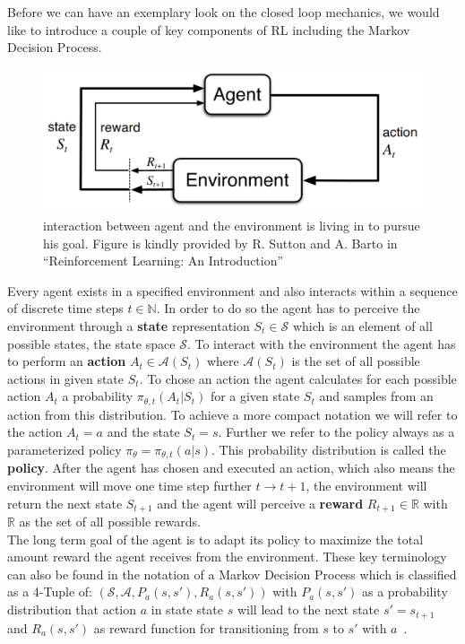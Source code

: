 Before we can have an exemplary look on the closed loop mechanics, we would like to introduce a couple of key components of RL including the Markov Decision Process.

% 
\begin{figure}
	\centering
    \includegraphics[width=\linewidth,]{figures/background/agent-environment-interaction.png}
	\caption[Interaction between agent and environment]{interaction between agent and the environment is living in to pursue his goal. Figure is kindly provided by R. Sutton and A. Barto in ``Reinforcement Learning: An Introduction''~\cite{SuttonBartoRLBook}}
	\label{fig:agent-environment_interaction}
	\endminipage
\end{figure}

Every agent exists in a specified environment and also interacts within a sequence of discrete time steps $t \in \mathbb{N}$. In order to do so the agent has to perceive the environment through a \textbf{state} representation $S_t \in \mathcal{S}$ which is an element of all possible states, the state space $\mathcal{S}$. To interact with the environment the agent has to perform an \textbf{action} $A_t \in \mathcal{A}(S_t)$ where $\mathcal{A}(S_t)$ is the set of all possible actions in given state $S_t$. To chose an action the agent calculates for each possible action $A_t$ a probability $\pi_{\theta, t}(A_t|S_t)$ for a given state $S_t$ and samples from an action from this distribution. To achieve a more compact notation we will refer to the action $A_t = a$ and the state $S_t = s$. Further we refer to the policy always as a parameterized policy $\pi_\theta = \pi_{\theta, t}(a|s)$.  
This probability distribution is called the \textbf{policy}. 
After the agent has chosen and executed an action, which also means the environment will move one time step further $t \to t + 1$, the environment will return the next state $S_{t+1}$ and the agent will perceive a \textbf{reward} $R_{t+1} \in \mathbb{R}$ with $\mathbb{R}$ as the set of all possible rewards.\\
The long term goal of the agent is to adapt its policy to maximize the total amount reward the agent receives from the environment.
These key terminology can also be found in the notation of a Markov Decision Process which is classified as a 4-Tuple of: $(\mathcal{S}, \mathcal{A}, P_a(s, s'), R_a(s, s'))$ with $ P_a(s, s')$ as a probability distribution that action $a$ in state state $s$ will lead to the next state $s' = s_{t+1}$ and $ R_a(s, s')$ as reward function for transitioning from $s$ to $s'$ with $a$~\cite{SuttonBartoRLBook}.

